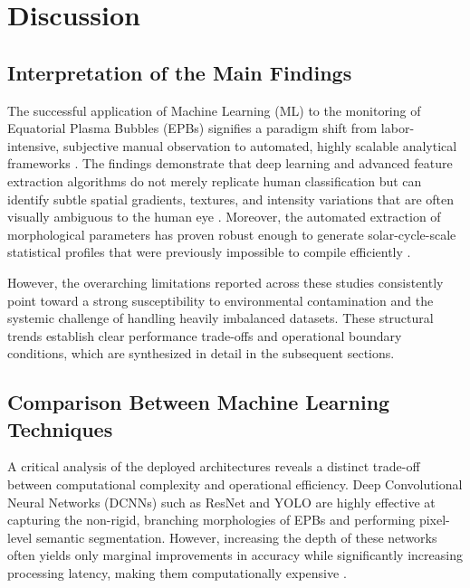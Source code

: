 \section{Discussion}\label{sec:discussion}

\subsection{Interpretation of the Main Findings}\label{subsec:interpretation-of-the-main-findings}

The successful application of Machine Learning (ML) to the monitoring of Equatorial Plasma Bubbles (EPBs) signifies a paradigm shift from labor-intensive, subjective manual observation to automated, highly scalable analytical frameworks \cite{zhong2025automatic,okoh2025bootstrapping}. The findings demonstrate that deep learning and advanced feature extraction algorithms do not merely replicate human classification but can identify subtle spatial gradients, textures, and intensity variations that are often visually ambiguous to the human eye \cite{okoh2025bootstrapping}. Moreover, the automated extraction of morphological parameters has proven robust enough to generate solar-cycle-scale statistical profiles that were previously impossible to compile efficiently \cite{zhong2025statistical}.

However, the overarching limitations reported across these studies consistently point toward a strong susceptibility to environmental contamination and the systemic challenge of handling heavily imbalanced datasets. These structural trends establish clear performance trade-offs and operational boundary conditions, which are synthesized in detail in the subsequent sections.

\subsection{Comparison Between Machine Learning Techniques}\label{subsec:comparison-between-machine-learning-techniques}

A critical analysis of the deployed architectures reveals a distinct trade-off between computational complexity and operational efficiency. Deep Convolutional Neural Networks (DCNNs) such as ResNet and YOLO are highly effective at capturing the non-rigid, branching morphologies of EPBs and performing pixel-level semantic segmentation. \cite{zhong2025automatic,srisamoodkham2022detecting} However, increasing the depth of these networks often yields only marginal improvements in accuracy while significantly increasing processing latency, making them computationally expensive \cite{thanakulketsarat2023classification}.

